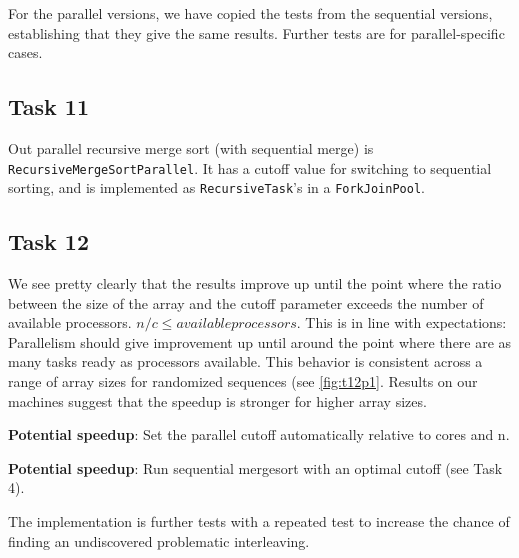 \documentclass[11pt, a4paper]{article}
\begin{document}
For the parallel versions, we have copied the tests from the sequential versions, establishing that they give the same results. 
Further tests are for parallel-specific cases.

\subsection{Task 11}

Out parallel recursive merge sort (with sequential merge) is \texttt{Recursive\-MergeSort\-Parallel}. It has a cutoff value for switching to sequential sorting, and is implemented as \texttt{Recursive\-Task}'s in a \texttt{Fork\-Join\-Pool}.

\subsection{Task 12}

We see pretty clearly that the results improve up until the point where the ratio between
the size of the array and the cutoff parameter exceeds the number of available processors.
$n / c \leq available processors$.
This is in line with expectations: Parallelism should give improvement up until around the point where there are as many tasks ready as processors available.
This behavior is consistent across a range of array sizes for randomized sequences (see \ref{fig:t12p1}.
Results on our machines suggest that the speedup is stronger for higher array sizes.

\textbf{Potential speedup}: Set the parallel cutoff automatically relative to cores and n.

\textbf{Potential speedup}: Run sequential mergesort with an optimal cutoff (see Task 4).

The implementation is further tests with a repeated test to increase the chance of finding an undiscovered problematic interleaving.
\end{document}
